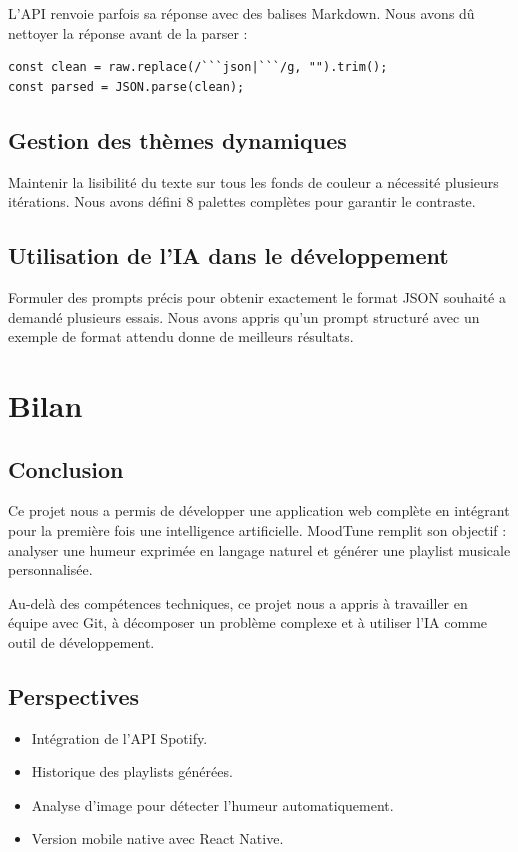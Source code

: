 \documentclass[a4paper, 12pt, twoside]{article}
\begin{document}
L'API renvoie parfois sa réponse avec des balises Markdown. Nous avons dû nettoyer la réponse avant de la parser :

\begin{verbatim}
const clean = raw.replace(/```json|```/g, "").trim();
const parsed = JSON.parse(clean);
\end{verbatim}

\subsection{Gestion des thèmes dynamiques}

Maintenir la lisibilité du texte sur tous les fonds de couleur a nécessité plusieurs itérations. Nous avons défini 8 palettes complètes pour garantir le contraste.

\subsection{Utilisation de l'IA dans le développement}

Formuler des prompts précis pour obtenir exactement le format JSON souhaité a demandé plusieurs essais. Nous avons appris qu'un prompt structuré avec un exemple de format attendu donne de meilleurs résultats.

\section{Bilan}

\subsection{Conclusion}

Ce projet nous a permis de développer une application web complète en intégrant pour la première fois une intelligence artificielle. MoodTune remplit son objectif : analyser une humeur exprimée en langage naturel et générer une playlist musicale personnalisée.

Au-delà des compétences techniques, ce projet nous a appris à travailler en équipe avec Git, à décomposer un problème complexe et à utiliser l'IA comme outil de développement.

\subsection{Perspectives}

\begin{itemize}
    \item Intégration de l'API Spotify.
    \item Historique des playlists générées.
    \item Analyse d'image pour détecter l'humeur automatiquement.
    \item Version mobile native avec React Native.
\end{itemize}
\end{document}
